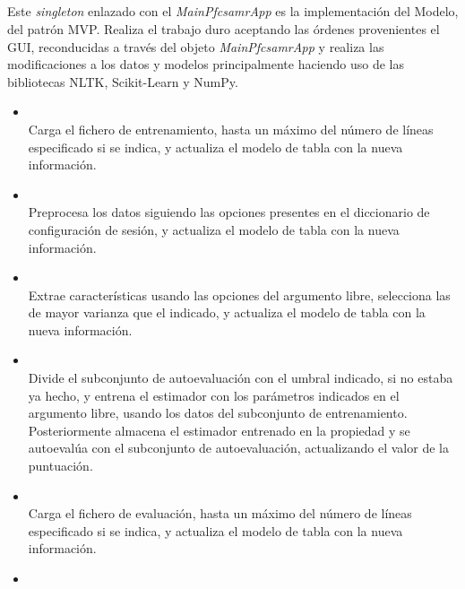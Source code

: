 \subsection{}

Este \emph{singleton} enlazado con el \emph{MainPfcsamrApp} es la implementación del Modelo, del patrón MVP. Realiza el trabajo duro aceptando las órdenes provenientes el GUI, reconducidas a través del objeto \emph{MainPfcsamrApp} y realiza las modificaciones a los datos y modelos principalmente haciendo uso de las bibliotecas NLTK, Scikit-Learn y NumPy.

\begin{itemize}
\item {}\\
Carga el fichero de entrenamiento, hasta un máximo del número de líneas especificado si se indica, y actualiza el modelo de tabla con la nueva información.
\item {}\\
Preprocesa los datos siguiendo las opciones presentes en el diccionario de configuración de sesión, y actualiza el modelo de tabla con la nueva información.
\item {}\\
Extrae características usando las opciones del argumento libre, selecciona las de mayor varianza que el indicado, y actualiza el modelo de tabla con la nueva información.
\item {}\\
Divide el subconjunto de autoevaluación con el umbral indicado, si no estaba ya hecho, y entrena el estimador con los parámetros indicados en el argumento libre, usando los datos del subconjunto de entrenamiento. Posteriormente almacena el estimador entrenado en la propiedad  y se autoevalúa con el subconjunto de autoevaluación, actualizando el valor de la puntuación.
\item {}\\
Carga el fichero de evaluación, hasta un máximo del número de líneas especificado si se indica, y actualiza el modelo de tabla con la nueva información.
\item {}\\

\end{itemize}
